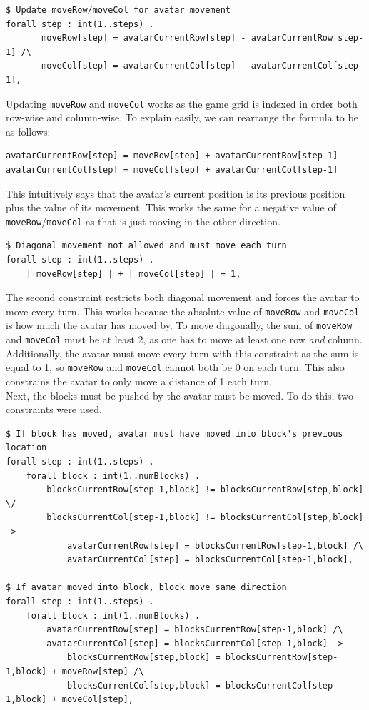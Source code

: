 \documentclass{article}
\newcommand{\n}[0]{\\[\baselineskip]}
\begin{document}
\begin{lstlisting}[caption={Updating \texttt{moveRow} and \texttt{moveCol}},captionpos=b]
$ Update moveRow/moveCol for avatar movement
forall step : int(1..steps) .
       moveRow[step] = avatarCurrentRow[step] - avatarCurrentRow[step-1] /\
       moveCol[step] = avatarCurrentCol[step] - avatarCurrentCol[step-1],

\end{lstlisting}
Updating \texttt{moveRow} and \texttt{moveCol} works as the game grid is indexed in order both row-wise and column-wise. To explain easily, we can rearrange the formula to be as follows:
\begin{lstlisting}
avatarCurrentRow[step] = moveRow[step] + avatarCurrentRow[step-1]
avatarCurrentCol[step] = moveCol[step] + avatarCurrentCol[step-1]
\end{lstlisting}
This intuitively says that the avatar's current position is its previous position plus the value of its movement. This works the same for a negative value of \texttt{moveRow}/\texttt{moveCol} as that is just moving in the other direction.
\begin{lstlisting}[caption={Prevent diagonal movement and force movement every turn}, captionpos=b]
$ Diagonal movement not allowed and must move each turn
forall step : int(1..steps) .
    | moveRow[step] | + | moveCol[step] | = 1,
\end{lstlisting}
The second constraint restricts both diagonal movement and forces the avatar to move every turn. This works because the absolute value of \texttt{moveRow} and \texttt{moveCol} is how much the avatar has moved by. To move diagonally, the sum of \texttt{moveRow} and \texttt{moveCol} must be at least 2, as one has to move at least one row \textit{and} column. Additionally, the avatar must move every turn with this constraint as the sum is equal to 1, so \texttt{moveRow} and \texttt{moveCol} cannot both be 0 on each turn. This also constrains the avatar to only move a distance of 1 each turn.
\n
Next, the blocks must be pushed by the avatar must be moved. To do this, two constraints were used.
\begin{lstlisting}[caption={Constraints for moving blocks}, captionpos=b]
$ If block has moved, avatar must have moved into block's previous location
forall step : int(1..steps) .
    forall block : int(1..numBlocks) .
        blocksCurrentRow[step-1,block] != blocksCurrentRow[step,block] \/
		blocksCurrentCol[step-1,block] != blocksCurrentCol[step,block] ->
	    	avatarCurrentRow[step] = blocksCurrentRow[step-1,block] /\
	    	avatarCurrentCol[step] = blocksCurrentCol[step-1,block],

$ If avatar moved into block, block move same direction
forall step : int(1..steps) .
    forall block : int(1..numBlocks) .
        avatarCurrentRow[step] = blocksCurrentRow[step-1,block] /\
		avatarCurrentCol[step] = blocksCurrentCol[step-1,block] ->
	    	blocksCurrentRow[step,block] = blocksCurrentRow[step-1,block] + moveRow[step] /\
	    	blocksCurrentCol[step,block] = blocksCurrentCol[step-1,block] + moveCol[step],
\end{lstlisting}
\end{document}
